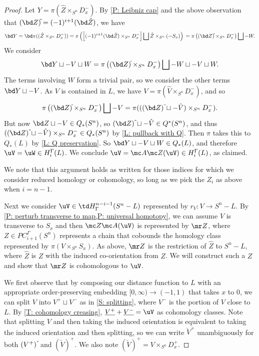 \begin{example}
\begin{proof}
	Let $Y = \pi(\hat Z \times_{S^n} D_x^-)$.
	By \cref{P: Leibniz cap} and the above observation that $(\bd Z)\hat{\vrule height1.3ex width0pt} = (-1)^{i+1} (\bd \hat Z)$, we have
	\begin{equation*}
		\bd Y = \bd \pi((\hat Z \times_{S^n} D_x^-))
		= \pi\left(\left[(-1)^{i+1} (\bd \hat Z) \times_{S^n} D_x^-\right] \bigsqcup \hat Z \times_{S^n} (-S_x)\right)\\
		= \pi\left((\bd Z)\hat{\vrule height1.3ex width0pt} \times_{S^n} D_x^- \right) \bigsqcup -W.
	\end{equation*}
	We consider
	\begin{equation*}
	\bd Y \sqcup -V\sqcup W =\pi\left((\bd Z)\hat{\vrule height1.3ex width0pt} \times_{S^n} D_x^- \right) \bigsqcup -W \sqcup -V \sqcup W.
	\end{equation*}
	The terms involving $W$ form a trivial pair, so we consider the other terms $\bd Y \sqcup -V$.
	As $V$ is contained in $L$, we have $V = \pi(\hat V \times_{S^n} D_x^-)$, and so
	$$\pi\left((\bd Z)\hat{\vrule height1.3ex width0pt} \times_{S^n} D_x^- \right) \bigsqcup -V = \pi(((\bd  Z)\,\hat{\vrule height1.3ex width0pt} \sqcup -\hat V) \times_{S^n} D_x^-).$$
	But now $\bd Z \sqcup -V \in Q_*(S^n)$, so $(\bd  Z)\,\hat{\vrule height1.3ex width0pt} \sqcup -\hat V \in Q^*(S^n)$, and thus $((\bd  Z)\,\hat{\vrule height1.3ex width0pt} \sqcup -\hat V) \times_{S^n} D_x^- \in Q_*(S^n)$ by \cref{L: pullback with Q}.
	Then $\pi$ takes this to $Q_*(L)$ by \cref{L: Q preservation}.
	So $\bd Y \sqcup -V \sqcup W \in Q_*(L)$, and therefore $\uV = \uW \in H_i^\Gamma(L)$.
	We conclude  $\uV = \mc A \mc Z(\uV) \in H_i^\Gamma(L)$, as claimed.

	We note that this argument holds as written for those indices for which we consider reduced homology or cohomology, so long as we pick the $Z_i$ as above when $i = n-1$.

	Next we consider $\uV \in \td H^{n-i-1}_\Gamma(S^n-L)$ represented by $r_V \colon V \to S^n-L$.
	By \cref{P: perturb transverse to map,P: universal homotopy}, we can assume $V$ is transverse to $S_x$ and then $\mc Z \mc A(\uV)$ is represented by $\mr Z$, where $Z \in PC_{i+1}^\Gamma(S^n)$ represents a chain that cobounds the homology class represented by $\pi(V \times_{S^n} S_x)$.
	As above, $\mr Z$ is the restriction of $\hat Z$ to $S^n-L$, where $\hat Z$ is $Z$ with the induced co-orientation from $Z$.
	We will construct such a $Z$ and show that $\mr Z$ is cohomologous to $\uV$.

	We first observe that by composing our distance function to $L$ with an appropriate order-preserving embedding $[0,\infty) \to (-1,1)$ that takes $x$ to $0$, we can split $V$ into $V^+ \sqcup V^-$ as in \cref{S: splitting}, where $V^-$ is the portion of $V$ close to $L$.
	By \cref{T: cohomology creasing}, $\underline{V^+} + \underline{V^-} = \uV$ as cohomology classes.
	Note that splitting $V$ and then taking the induced orientation is equivalent to taking the induced orientation and then splitting, so we can write $\check V^+$ unambiguously for both $(V^+)\,\check{\vrule height1.3ex width0pt}$ and $(\check V)^+$.
	We also note $(\check V)^+ = V \times_{S^n} D_x^+$.


\end{proof}
\end{example}
